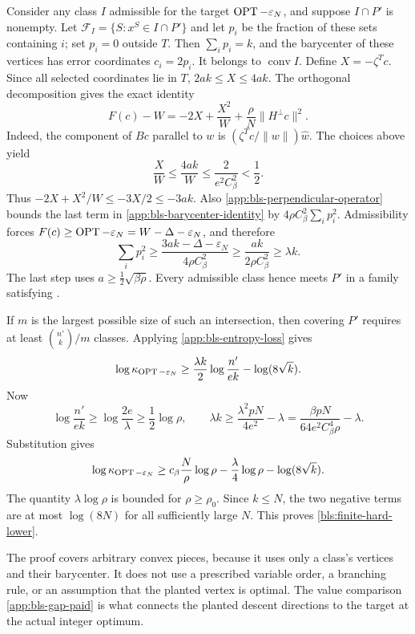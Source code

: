 Consider any class $I$ admissible for the target
$\operatorname{OPT}-\varepsilon_N$, and suppose $I\cap P'$ is nonempty.
Let $\mathcal F_I=\{S:x^S\in I\cap P'\}$ and let $p_i$ be the
fraction of these sets containing $i$; set $p_i=0$ outside $T$.
Then $\sum_i p_i=k$, and the barycenter of these vertices has error
coordinates $c_i=2p_i$.  It belongs to $\operatorname{conv} I$.
Define $X=-\zeta^Tc$.  Since all selected coordinates lie in $T$,
$2ak\le X\le4ak$.
The orthogonal decomposition gives the exact identity
\begin{equation}
 F(c)-W=-2X+\frac{X^2}{W}
                  +\frac\rho N\|H^\perp c\|^2.
 \label{app:bls-barycenter-identity}
\end{equation}
Indeed, the component of $Bc$ parallel to $w$ is
$(\zeta^Tc/\|w\|)\widehat w$.
The choices above yield
\[
 \frac XW\le\frac{4ak}{W}
 \le\frac{2}{e^2C_\beta^2}<\frac12.
\]
Thus $-2X+X^2/W\le-3X/2\le-3ak$.
Also \eqref{app:bls-perpendicular-operator} bounds the last term in
\eqref{app:bls-barycenter-identity} by
$4\rho C_\beta^2\sum_i p_i^2$.
Admissibility forces $F(c)\ge\operatorname{OPT}-\varepsilon_N
=W-\Delta-\varepsilon_N$, and therefore
\begin{equation}
 \sum_i p_i^2
 \ge\frac{3ak-\Delta-\varepsilon_N}{4\rho C_\beta^2}
 \ge\frac{ak}{2\rho C_\beta^2}
 \ge\lambda k.
 \label{app:bls-forced-overlap}
\end{equation}
The last step uses $a\ge\tfrac12\sqrt{\beta\rho}$.
Every admissible class hence meets $P'$ in a family satisfying
.

If $m$ is the largest possible size of such an intersection, then covering
$P'$ requires at least $\binom{n'}k/m$ classes.  Applying
\eqref{app:bls-entropy-loss} gives
\begin{equation}
 \log\kappa_{\operatorname{OPT}-\varepsilon_N}
 \ge\frac{\lambda k}{2}\log\frac{n'}{ek}
                         -\log(8\sqrt k).
 \label{app:bls-class-count}
\end{equation}
Now
\[
 \log\frac{n'}{ek}\ge\log\frac{2e}\lambda\ge\frac12\log\rho,
 \qquad
 \lambda k\ge\frac{\lambda^2pN}{4e^2}-\lambda
 =\frac{\beta pN}{64e^2C_\beta^4\rho}-\lambda.
\]
Substitution gives
\[
 \log\kappa_{\operatorname{OPT}-\varepsilon_N}
 \ge c_\beta\frac N\rho\log\rho
       -\frac\lambda4\log\rho-\log(8\sqrt k).
\]
The quantity $\lambda\log\rho$ is bounded for $\rho\ge\rho_0$.
Since $k\le N$, the two negative terms are at most $\log(8N)$ for all
sufficiently large $N$.  This proves \eqref{bls:finite-hard-lower}.

The proof covers arbitrary convex pieces, because it uses only a class's
vertices and their barycenter.  It does not use a prescribed variable
order, a branching rule, or an assumption that the planted vertex is
optimal.  The value comparison \eqref{app:bls-gap-paid} is what connects
the planted descent directions to the target at the actual integer
optimum.
